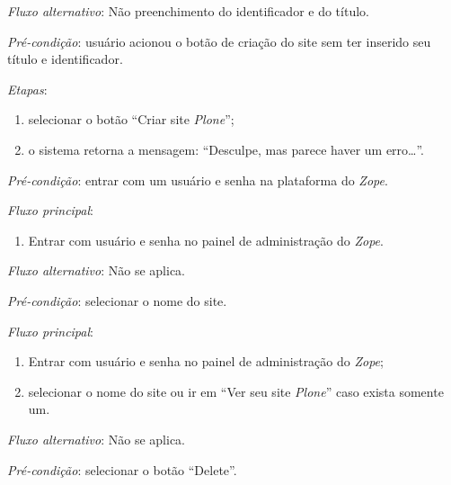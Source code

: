 \noindent \textit{Fluxo alternativo}: Não preenchimento do identificador e do título.

\noindent \textit{Pré-condição}: usuário acionou o botão de criação do site sem ter inserido seu título e identificador.

\noindent \textit{Etapas}:

\begin{enumerate}
    \item selecionar o botão ``Criar site \textit{Plone}'';
    \item o sistema retorna a mensagem: ``Desculpe, mas parece haver um erro…''.
\end{enumerate}


\vspace{0.7cm}

\noindent \textit{Pré-condição}: entrar com um usuário e senha na plataforma do \textit{Zope}.

\noindent \textit{Fluxo principal}:

\begin{enumerate}
    \item Entrar com usuário e senha no painel de administração do \textit{Zope}.
\end{enumerate}

\noindent \textit{Fluxo alternativo}: Não se aplica.


\vspace{0.7cm}

\noindent \textit{Pré-condição}: selecionar o nome do site.

\noindent \textit{Fluxo principal}:

\begin{enumerate}
    \item Entrar com usuário e senha no painel de administração do \textit{Zope};
    \item selecionar o nome do site ou ir em ``Ver seu site \textit{Plone}'' caso exista somente um.
\end{enumerate}

\noindent \textit{Fluxo alternativo}: Não se aplica.


\vspace{0.7cm}

\noindent \textit{Pré-condição}: selecionar o botão ``Delete''.

